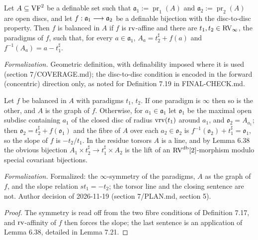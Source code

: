 \setcounter{theorem}{16}
\begin{definition}
\label{defn-balance}
\leanok
{}
Let $A \subseteq \mathrm{VF}^2$ be a definable set such that $\mathfrak{a}_1 := \operatorname{pr}_1(A)$ and $\mathfrak{a}_2 := \operatorname{pr}_2(A)$ are open discs, and let $f : \mathfrak{a}_1 \longrightarrow \mathfrak{a}_2$ be a definable bijection with the disc-to-disc property. Then $f$ is balanced in $A$ if $f$ is $\operatorname{rv}$-affine and there are $t_1, t_2 \in \mathrm{RV}_\infty$, the paradigms of $f$, such that, for every $a \in \mathfrak{a}_1$, $A_a = t_2^\sharp + f(a)$ and $f^{-1}(A_a) = a - t_1^\sharp$.

\emph{Formalization.} Geometric definition, with definability imposed where it is used (section 7/COVERAGE.md); the disc-to-disc condition is encoded in the forward (concentric) direction only, as noted for Definition 7.19 in FINAL-CHECK.md.
\end{definition}

\setcounter{theorem}{17}
\begin{remark}
\label{2cell-linear}
\leanok
{}
Let $f$ be balanced in $A$ with paradigms $t_1$, $t_2$. If one paradigm is $\infty$ then so is the other, and $A$ is the graph of $f$. Otherwise, for $a_1 \in \mathfrak{a}_1$ let $\mathfrak{o}_1$ be the maximal open subdisc containing $a_1$ of the closed disc of radius $\operatorname{vrv}(t_1)$ around $a_1$, and $\mathfrak{o}_2 = A_{a_1}$; then $\mathfrak{o}_2 = t_2^\sharp + f(\mathfrak{o}_1)$ and the fibre of $A$ over each $a_2 \in \mathfrak{o}_2$ is $f^{-1}(\mathfrak{o}_2) + t_1^\sharp = \mathfrak{o}_1$, so the slope of $f$ is $-t_2/t_1$. In the residue torsors $A$ is a line, and by Lemma 6.38 the obvious bijection $A_1 \times t_2^\sharp \to t_1^\sharp \times A_2$ is the lift of an $\mathrm{RV}^{\operatorname{db}}[2]$-morphism modulo special covariant bijections.

\emph{Formalization.} Formalized: the $\infty$-symmetry of the paradigms, $A$ as the graph of $f$, and the slope relation $s t_1 = -t_2$; the torsor line and the closing sentence are not. Author decision of 2026-11-19 (section 7/PLAN.md, section 5).
\end{remark}

\begin{proof}
The symmetry is read off from the two fibre conditions of Definition 7.17, and $\operatorname{rv}$-affinity of $f$ then forces the slope; the last sentence is an application of Lemma 6.38, detailed in Lemma 7.21.
\end{proof}

